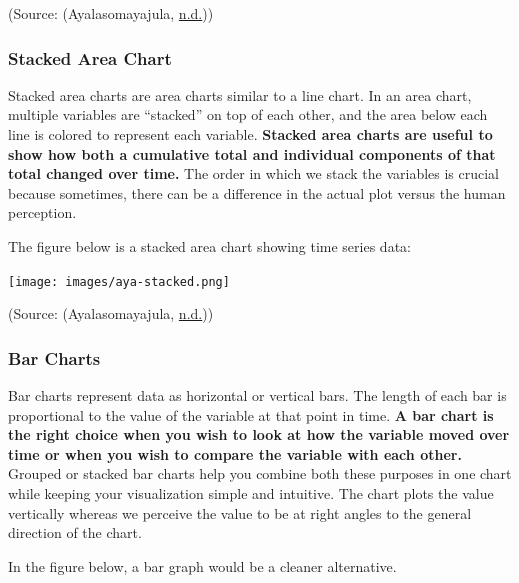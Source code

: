 \documentclass[]{book}
\begin{document}
(Source: (Ayalasomayajula, \protect\hyperlink{ref-socialcops}{n.d.}))

\hypertarget{stacked-area-chart}{%
\subsubsection{Stacked Area Chart}\label{stacked-area-chart}}

Stacked area charts are area charts similar to a line chart. In an area chart, multiple variables are ``stacked'' on top of each other, and the area below each line is colored to represent each variable. \textbf{Stacked area charts are useful to show how both a cumulative total and individual components of that total changed over time.} The order in which we stack the variables is crucial because sometimes, there can be a difference in the actual plot versus the human perception.

The figure below is a stacked area chart showing time series data:

\texttt{[image: images/aya-stacked.png]}

(Source: (Ayalasomayajula, \protect\hyperlink{ref-aya-time-series}{n.d.}))

\hypertarget{bar-charts}{%
\subsubsection{Bar Charts}\label{bar-charts}}

Bar charts represent data as horizontal or vertical bars. The length of each bar is proportional to the value of the variable at that point in time. \textbf{A bar chart is the right choice when you wish to look at how the variable moved over time or when you wish to compare the variable with each other.} Grouped or stacked bar charts help you combine both these purposes in one chart while keeping your visualization simple and intuitive. The chart plots the value vertically whereas we perceive the value to be at right angles to the general direction of the chart.

In the figure below, a bar graph would be a cleaner alternative.
\end{document}
